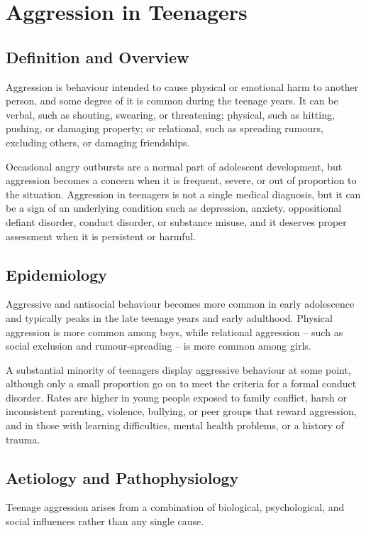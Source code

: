 \chapter{Aggression in Teenagers}

\section*{Definition and Overview}
Aggression is behaviour intended to cause physical or emotional harm to another person, and some degree of it is common during the teenage years. It can be verbal, such as shouting, swearing, or threatening; physical, such as hitting, pushing, or damaging property; or relational, such as spreading rumours, excluding others, or damaging friendships.

Occasional angry outbursts are a normal part of adolescent development, but aggression becomes a concern when it is frequent, severe, or out of proportion to the situation. Aggression in teenagers is not a single medical diagnosis, but it can be a sign of an underlying condition such as depression, anxiety, oppositional defiant disorder, conduct disorder, or substance misuse, and it deserves proper assessment when it is persistent or harmful.

\section*{Epidemiology}
Aggressive and antisocial behaviour becomes more common in early adolescence and typically peaks in the late teenage years and early adulthood. Physical aggression is more common among boys, while relational aggression -- such as social exclusion and rumour-spreading -- is more common among girls.

A substantial minority of teenagers display aggressive behaviour at some point, although only a small proportion go on to meet the criteria for a formal conduct disorder. Rates are higher in young people exposed to family conflict, harsh or inconsistent parenting, violence, bullying, or peer groups that reward aggression, and in those with learning difficulties, mental health problems, or a history of trauma.

\section*{Aetiology and Pathophysiology}
Teenage aggression arises from a combination of biological, psychological, and social influences rather than any single cause.

